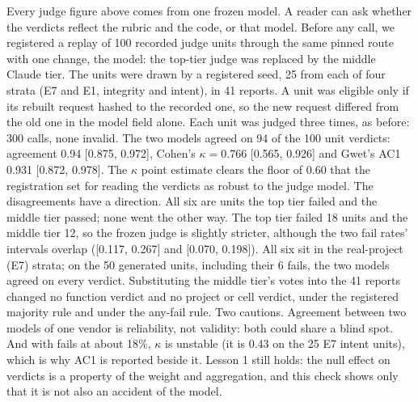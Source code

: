 \documentclass[10pt,a4paper]{article}
\begin{document}
Every judge figure above comes from one frozen model. A reader can ask whether the verdicts reflect the rubric and
the code, or that model. Before any call, we registered a replay of 100 recorded judge units through the same pinned
route with one change, the model: the top-tier judge was replaced by the middle Claude tier. The units were drawn by
a registered seed, 25 from each of four strata (E7 and E1, integrity and intent), in 41 reports. A unit was eligible
only if its rebuilt request hashed to the recorded one, so the new request differed from the old one in the model
field alone. Each unit was judged three times, as before: 300 calls, none invalid.
The two models agreed on 94 of the 100 unit verdicts: agreement 0.94 [0.875, 0.972], Cohen's $\kappa = 0.766$
[0.565, 0.926] and Gwet's AC1 0.931 [0.872, 0.978]. The $\kappa$ point estimate clears the floor of 0.60 that
the registration set for reading the verdicts as robust to the judge model.
The disagreements have a direction. All six are units the top tier failed and the middle tier passed; none went the
other way. The top tier failed 18 units and the middle tier 12, so the frozen judge is slightly stricter, although
the two fail rates' intervals overlap ([0.117, 0.267] and [0.070, 0.198]). All six sit in the real-project (E7)
strata; on the 50 generated units, including their 6 fails, the two models agreed on every verdict.
Substituting the middle tier's votes into the 41 reports changed no function verdict and no project or cell
verdict, under the registered majority rule and under the any-fail rule.
Two cautions. Agreement between two models of one vendor is reliability, not validity: both could share a blind
spot. And with fails at about 18\%, $\kappa$ is unstable (it is 0.43 on the 25 E7 intent units), which is why AC1 is
reported beside it. Lesson 1 still holds: the null effect on verdicts is a property of the weight and aggregation,
and this check shows only that it is not also an accident of the model.
\end{document}
